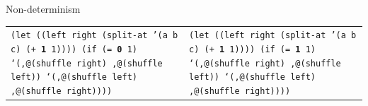 \documentclass{beamer}
\begin{document}
\begin{frame}{Non-determinism}
\begin{tabularx}{\textwidth}{ X X }
    \texttt{(let ((left right (split-at '(a b c)\newline
      \hphantom{\_\_\_\_\_\_\_\_\_\_\_\_\_\_\_\_\_\_\_}
      (+ \textbf{1} 1))))\newline
      \hphantom{\_\_}(if (= \textbf{0} 1)\newline
      \hphantom{\_\_\_\_\_\_}`(,@(shuffle right)\newline
      \hphantom{ \_\_\_\_\_\_\_},@(shuffle left))\newline
      \hphantom{ \_\_\_\_}`(,@(shuffle left)\newline
      \hphantom{ \_\_\_\_\_\_},@(shuffle right))))\newline
      \ 
    }
    &
    \texttt{(let ((left right (split-at '(a b c)\newline
      \hphantom{\_\_\_\_\_\_\_\_\_\_\_\_\_\_\_\_\_\_\_}
      (+ \textbf{1} 1))))\newline
      \hphantom{\_\_}(if (= \textbf{1} 1)\newline
      \hphantom{\_\_\_\_\_\_}`(,@(shuffle right)\newline
      \hphantom{ \_\_\_\_\_\_\_},@(shuffle left))\newline
      \hphantom{ \_\_\_\_}`(,@(shuffle left)\newline
      \hphantom{ \_\_\_\_\_\_},@(shuffle right))))\newline
      \ 
    }

  \end{tabularx}
\end{frame}
\end{document}
